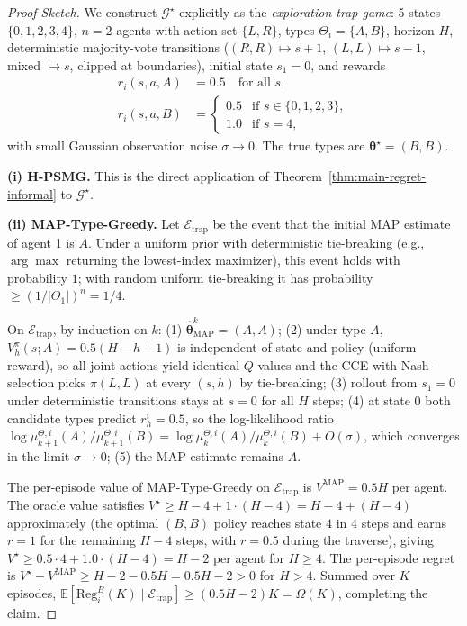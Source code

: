 \documentclass{article}
\begin{document}
\begin{proof}[Proof Sketch]
We construct $\mathcal{G}^\star$ explicitly as the \emph{exploration-trap game}: 5 states $\{0, 1, 2, 3, 4\}$, $n = 2$ agents with action set $\{L, R\}$, types $\Theta_i = \{A, B\}$, horizon $H$, deterministic majority-vote transitions ($(R, R) \mapsto s+1$, $(L, L) \mapsto s-1$, mixed $\mapsto s$, clipped at boundaries), initial state $s_1 = 0$, and rewards
\begin{align}
r_i(s, a, A) &= 0.5 \quad \text{for all } s, \\
r_i(s, a, B) &= \begin{cases} 0.5 & \text{if } s \in \{0, 1, 2, 3\}, \\ 1.0 & \text{if } s = 4, \end{cases}
\end{align}
with small Gaussian observation noise $\sigma \to 0$. The true types are $\boldsymbol{\theta}^\star = (B, B)$.

\textbf{(i) H-PSMG.} This is the direct application of Theorem~\ref{thm:main-regret-informal} to $\mathcal{G}^\star$.

\textbf{(ii) MAP-Type-Greedy.} Let $\mathcal{E}_{\mathrm{trap}}$ be the event that the initial MAP estimate of agent 1 is $A$. Under a uniform prior with deterministic tie-breaking (e.g., $\arg\max$ returning the lowest-index maximizer), this event holds with probability $1$; with random uniform tie-breaking it has probability $\geq (1/|\Theta_1|)^n = 1/4$.

On $\mathcal{E}_{\mathrm{trap}}$, by induction on $k$: (1) $\hat{\boldsymbol{\theta}}_{\mathrm{MAP}}^k = (A, A)$; (2) under type $A$, $V_h^{\pi}(s; A) = 0.5(H-h+1)$ is independent of state and policy (uniform reward), so all joint actions yield identical $Q$-values and the CCE-with-Nash-selection picks $\pi(L, L)$ at every $(s, h)$ by tie-breaking; (3) rollout from $s_1 = 0$ under deterministic transitions stays at $s = 0$ for all $H$ steps; (4) at state $0$ both candidate types predict $r_h^i = 0.5$, so the log-likelihood ratio $\log \mu_{k+1}^{\Theta,i}(A) / \mu_{k+1}^{\Theta,i}(B) = \log \mu_k^{\Theta,i}(A) / \mu_k^{\Theta,i}(B) + O(\sigma)$, which converges in the limit $\sigma \to 0$; (5) the MAP estimate remains $A$.

The per-episode value of MAP-Type-Greedy on $\mathcal{E}_{\mathrm{trap}}$ is $V^{\mathrm{MAP}} = 0.5 H$ per agent. The oracle value satisfies $V^\star \geq H - 4 + 1 \cdot (H - 4) = H - 4 + (H - 4)$ approximately (the optimal $(B, B)$ policy reaches state $4$ in $4$ steps and earns $r = 1$ for the remaining $H - 4$ steps, with $r = 0.5$ during the traverse), giving $V^\star \geq 0.5 \cdot 4 + 1.0 \cdot (H - 4) = H - 2$ per agent for $H \geq 4$. The per-episode regret is $V^\star - V^{\mathrm{MAP}} \geq H - 2 - 0.5 H = 0.5 H - 2 > 0$ for $H > 4$. Summed over $K$ episodes, $\mathbb{E}[\mathrm{Reg}_i^B(K) \mid \mathcal{E}_{\mathrm{trap}}] \geq (0.5 H - 2) K = \Omega(K)$, completing the claim.


\end{proof}
\end{document}
